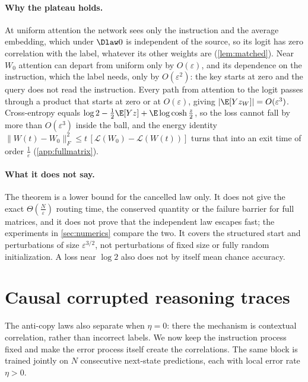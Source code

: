 \paragraph{Why the plateau holds.} At uniform attention the network sees only the instruction and the average embedding, which under $\Dlaw0$ is independent of the source, so
its logit has zero correlation with the label, whatever its other weights are (\cref{lem:matched}). Near $W_0$ attention can depart from uniform only by $O(\varepsilon)$,
and its dependence on the instruction, which the label needs, only by $O(\varepsilon^2)$: the key starts at zero and the query does not read the instruction.
Every path from attention to the logit passes through a product that starts at zero or at $O(\varepsilon)$, giving $|\E[Yz_W]|=O(\varepsilon^3)$.
Cross-entropy equals $\log2-\tfrac12\E[Yz]+\E\log\cosh\tfrac{z}{2}$, so the loss cannot fall by more than $O(\varepsilon^3)$ inside the ball, and the energy identity
$\|W(t)-W_0\|_F^2\le t\,[\mathcal L(W_0)-\mathcal L(W(t))]$ turns that into an exit time of order $\tfrac{1}{\varepsilon}$ (\cref{app:fullmatrix}).

\paragraph{What it does not say.} The theorem is a lower bound for the cancelled law only. It does not give the exact $\Theta(\tfrac{N}{\varepsilon})$ routing time,
the conserved quantity or the failure barrier for full matrices, and it does not prove that the independent law escapes fast; the
experiments in \cref{sec:numerics} compare the two. It covers the structured start and perturbations of size $\varepsilon^{3/2}$, not perturbations of fixed size
or fully random initialization. A loss near $\log2$ also does not by itself mean chance accuracy.

\section{Causal corrupted reasoning traces}
\label{sec:causal}
The anti-copy laws also separate when $\eta=0$: there the mechanism is contextual correlation, rather than incorrect labels.
We now keep the instruction process fixed and make the error process itself create the correlations.
The same block is trained jointly on $N$ consecutive next-state predictions, each with local error rate $\eta>0$.


